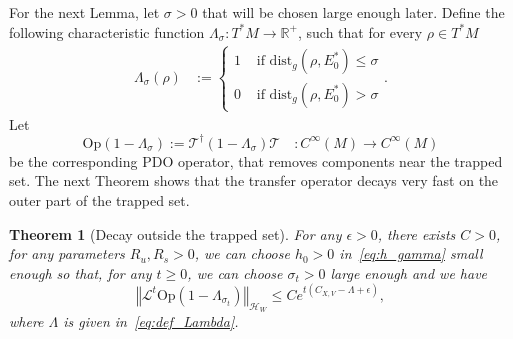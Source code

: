 \documentclass[10pt]{amsart}
\newtheorem{theo}{Theorem}[section]
\theoremstyle{definition}\newtheorem{defi}[theo]{Definition}\newtheorem{rema}[theo]{Remark}\newtheorem{exam}[theo]{Example}\newtheorem{exem}[theo]{Example}\newtheorem{nota}[theo]{Notation}
\newcommand{\clT}{\mathcal{T}}
\newcommand{\clH}{\mathcal{H}}
\newcommand{\clL}{\mathcal{L}}
\newcommand{\dist}{\mathrm{dist}}
\newcommand{\Opp}{\mathrm{Op}}
\newcommand{\bbR}{\mathbb{R}}
\begin{document}
For the next Lemma, let $\sigma>0$ that will be chosen large enough later. Define the following characteristic function $\Lambda_{\sigma}:T^{*}M\rightarrow\bbR^{+}$, such that for every $\rho\in T^{*}M$
\begin{equation*}\label{eq:def_Lambda-1}
\begin{split}
\Lambda_{\sigma}\left(\rho\right) & :=
\begin{cases}
1 & \text{ if }\dist_{g}\left(\rho,E_{0}^{*}\right)\leq\sigma\\
0 & \text{ if }\dist_{g}\left(\rho,E_{0}^{*}\right)>\sigma
\end{cases}.
\end{split}
\end{equation*}
Let
\begin{equation}\label{eq:def_op_Lambda}
\Opp \left(1-\Lambda_{\sigma}\right):=\clT^{\dagger}\left(1-\Lambda_{\sigma}\right)\clT\quad:C^{\infty}\left(M\right)\rightarrow C^{\infty}\left(M\right)
\end{equation}
be the corresponding PDO operator, that removes components near the trapped set. The next Theorem shows that the transfer operator decays very fast on the outer part of the trapped set.

\begin{cBoxB}{}
\begin{theo}[Decay outside the trapped set]\label{thm:decay_outside_trapped_set}
For any $\epsilon>0$, there exists $C>0$, for any parameters $R_{u},R_{s}>0$, we can choose $h_{0}>0$ in~\eqref{eq:h_gamma} small enough so that, for any $t\geq0$, we can choose $\sigma_{t}>0$ large enough and we have
\begin{equation}\label{eq:bound_C_X,V-2}
\left\Vert \clL^{t}\Opp \left(1-\Lambda_{\sigma_{t}}\right)\right\Vert _{\clH _{W}}\leq Ce^{t\left(C_{X,V}-\Lambda+\epsilon\right)},
\end{equation}
where $\Lambda$ is given in~\eqref{eq:def_Lambda}.
\end{theo}
\end{cBoxB}
\end{document}
